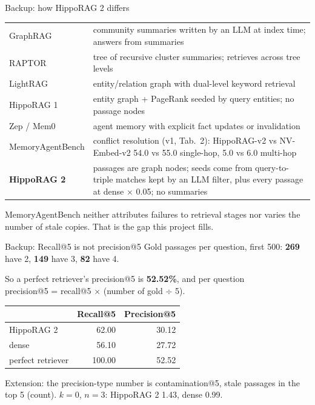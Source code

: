 \documentclass[aspectratio=169,12pt]{beamer}
\newcommand{\quiet}[1]{{\color{muted}\small #1}}
\begin{document}
\begin{frame}{Backup: how HippoRAG 2 differs}
\footnotesize
\begin{tabular}{@{}lp{}@{}}
\toprule
GraphRAG & community summaries written by an LLM at index time; answers from summaries\\
RAPTOR & tree of recursive cluster summaries; retrieves across tree levels\\
LightRAG & entity/relation graph with dual-level keyword retrieval\\
HippoRAG 1 & entity graph + PageRank seeded by query entities; no passage nodes\\
Zep / Mem0 & agent memory with explicit fact updates or invalidation\\
MemoryAgentBench & conflict resolution (v1, Tab.\ 2): HippoRAG-v2 vs NV-Embed-v2 54.0 vs 55.0 single-hop, 5.0 vs 6.0 multi-hop\\
\midrule
\textbf{HippoRAG 2} & passages are graph nodes; seeds come from query-to-triple matches kept by an LLM filter, plus every passage at dense $\times$ 0.05; no summaries\\
\bottomrule
\end{tabular}

\vspace{0.4em}
\quiet{MemoryAgentBench neither attributes failures to retrieval stages nor varies the number of stale copies. That is the gap this project fills.}
\end{frame}

\begin{frame}{Backup: Recall@5 is not precision@5}
\small
Gold passages per question, first 500: \textbf{269} have 2, \textbf{149} have 3, \textbf{82} have 4.

So a perfect retriever's precision@5 is \textbf{52.52\%}, and per question\\
\quad precision@5 = recall@5 $\times$ (number of gold $\div$ 5).

\vspace{0.5em}
\begin{tabular}{@{}lrr@{}}
\toprule
 & Recall@5 & Precision@5\\
\midrule
HippoRAG 2 & 62.00 & 30.12\\
dense & 56.10 & 27.72\\
perfect retriever & 100.00 & 52.52\\
\bottomrule
\end{tabular}

\vspace{0.5em}
\quiet{Extension: the precision-type number is contamination@5, stale passages in the top 5 (count). $k = 0$, $n = 3$: HippoRAG 2 1.43, dense 0.99.}
\end{frame}
\end{document}
